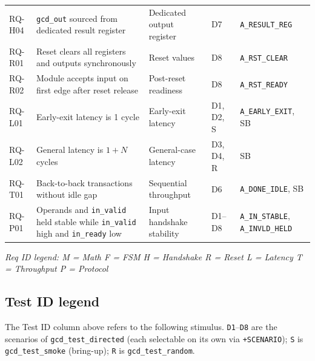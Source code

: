 \documentclass[11pt,a4paper]{article}
\begin{document}
{\begin{longtable}{@{}p{1.3cm} p{5.0cm} p{2.8cm} p{1.4cm} p{3.2cm}@{}}
RQ-H04 & \texttt{gcd\_out} sourced from dedicated result register & Dedicated output register & D7 & \texttt{A\_RESULT\_REG} \\

RQ-R01 & Reset clears all registers and outputs synchronously & Reset values & D8 & \texttt{A\_RST\_CLEAR} \\

RQ-R02 & Module accepts input on first edge after reset release & Post-reset readiness & D8 & \texttt{A\_RST\_READY} \\

RQ-L01 & Early-exit latency is 1 cycle & Early-exit latency & D1, D2, S & \texttt{A\_EARLY\_EXIT}, SB \\

RQ-L02 & General latency is $1+N$ cycles & General-case latency & D3, D4, R & SB \\

RQ-T01 & Back-to-back transactions without idle gap & Sequential throughput & D6 & \texttt{A\_DONE\_IDLE}, SB \\

RQ-P01 & Operands and \texttt{in\_valid} held stable while \texttt{in\_valid} high and \texttt{in\_ready} low & Input handshake stability & D1--D8 & \texttt{A\_IN\_STABLE}, \texttt{A\_INVLD\_HELD} \\

\end{longtable}

\vspace{-0.5em}
{\scriptsize \itshape \color{gray!70!black}
Req ID legend: M = Math \quad F = FSM \quad H = Handshake \quad R = Reset \quad L = Latency \quad T = Throughput \quad P = Protocol \\

}

\subsection*{Test ID legend}

The Test ID column above refers to the following stimulus. \texttt{D1}--\texttt{D8} are the
scenarios of \texttt{gcd\_test\_directed} (each selectable on its own via
\texttt{+SCENARIO}); \texttt{S} is \texttt{gcd\_test\_smoke} (bring-up); \texttt{R} is
\texttt{gcd\_test\_random}.

}
\end{document}

